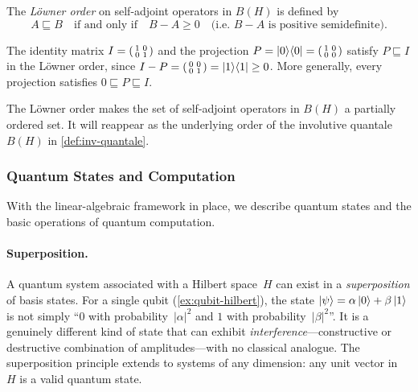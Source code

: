 \begin{definition}
\label{def:lowner-order}
The \emph{L\"owner order} on self-adjoint operators in $B(H)$ is
defined by
\[
  A \sqsubseteq B
  \quad\text{if and only if}\quad
  B - A \geq 0
  \quad\text{(i.e.\ $B - A$ is positive semidefinite)}.
\]
\end{definition}

\begin{example}
\label{ex:lowner-2x2}
The identity matrix
$I = \begin{psmallmatrix} 1 & 0 \\ 0 & 1 \end{psmallmatrix}$
and the projection
$P = \ket{0}\!\bra{0} =
\begin{psmallmatrix} 1 & 0 \\ 0 & 0 \end{psmallmatrix}$
satisfy $P \sqsubseteq I$ in the L\"owner order, since
$I - P = \begin{psmallmatrix} 0 & 0 \\ 0 & 1 \end{psmallmatrix}
= \ket{1}\!\bra{1} \geq 0$.
More generally, every projection satisfies
$0 \sqsubseteq P \sqsubseteq I$.
\end{example}

\noindent
The L\"owner order makes the set of self-adjoint operators in $B(H)$
a partially ordered set.
It will reappear as the underlying order of the involutive quantale
$B(H)$ in \cref{def:inv-quantale}.

\subsubsection{Quantum States and Computation}

With the linear-algebraic framework in place, we describe quantum
states and the basic operations of quantum computation.

\paragraph{Superposition.}
A quantum system associated with a Hilbert space~$H$ can exist in a
\emph{superposition} of basis states.
For a single qubit (\cref{ex:qubit-hilbert}), the state
$\ket{\psi} = \alpha\ket{0} + \beta\ket{1}$ is not simply ``$0$
with probability~$|\alpha|^2$ and $1$ with
probability~$|\beta|^2$''.
It is a genuinely different kind of state that can exhibit
\emph{interference}---constructive or destructive combination of
amplitudes---with no classical analogue.
The superposition principle extends to systems of any dimension: any
unit vector in~$H$ is a valid quantum state.

